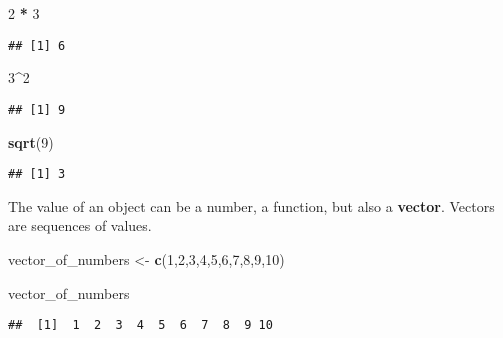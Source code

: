 \documentclass[
]{article}
\newenvironment{Shaded}{\begin{snugshade}}{\end{snugshade}}
\newcommand{\DecValTok}[1]{\textcolor[rgb]{0.00,0.00,0.81}{#1}}
\newcommand{\FunctionTok}[1]{\textcolor[rgb]{0.13,0.29,0.53}{\textbf{#1}}}
\newcommand{\NormalTok}[1]{#1}
\newcommand{\OtherTok}[1]{\textcolor[rgb]{0.56,0.35,0.01}{#1}}
\newcommand{\SpecialCharTok}[1]{\textcolor[rgb]{0.81,0.36,0.00}{\textbf{#1}}}
\begin{document}
\begin{Shaded}
\begin{Highlighting}[]
\DecValTok{2} \SpecialCharTok{*} \DecValTok{3}
\end{Highlighting}
\end{Shaded}

\begin{verbatim}
## [1] 6
\end{verbatim}

\begin{Shaded}
\begin{Highlighting}[]
\DecValTok{3}\SpecialCharTok{\^{}}\DecValTok{2}
\end{Highlighting}
\end{Shaded}

\begin{verbatim}
## [1] 9
\end{verbatim}

\begin{Shaded}
\begin{Highlighting}[]
\FunctionTok{sqrt}\NormalTok{(}\DecValTok{9}\NormalTok{)}
\end{Highlighting}
\end{Shaded}

\begin{verbatim}
## [1] 3
\end{verbatim}

The value of an object can be a number, a function, but also a \textbf{vector}.
Vectors are sequences of values.

\begin{Shaded}
\begin{Highlighting}[]
\NormalTok{vector\_of\_numbers }\OtherTok{\textless{}{-}} \FunctionTok{c}\NormalTok{(}\DecValTok{1}\NormalTok{,}\DecValTok{2}\NormalTok{,}\DecValTok{3}\NormalTok{,}\DecValTok{4}\NormalTok{,}\DecValTok{5}\NormalTok{,}\DecValTok{6}\NormalTok{,}\DecValTok{7}\NormalTok{,}\DecValTok{8}\NormalTok{,}\DecValTok{9}\NormalTok{,}\DecValTok{10}\NormalTok{) }
\end{Highlighting}
\end{Shaded}

\begin{Shaded}
\begin{Highlighting}[]
\NormalTok{vector\_of\_numbers}
\end{Highlighting}
\end{Shaded}

\begin{verbatim}
##  [1]  1  2  3  4  5  6  7  8  9 10
\end{verbatim}
\end{document}
